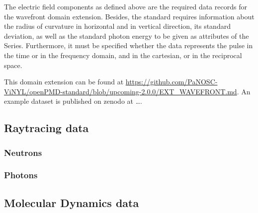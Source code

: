 \documentclass[11pt, a4paper]{article}
\begin{document}
The electric field components as defined above are the required data records for the wavefront domain extension.
Besides, the standard requires information about the radius of curvature in horizontal and in vertical direction, its
standard deviation, as well as the standard photon energy to be given as attributes of the Series. Furthermore, it must
be specified whether the data represents the pulse in the time or in the frequency domain, and in the cartesian, or in
the reciprocal space.

This domain extension can be found at \url{https://github.com/PaNOSC-ViNYL/openPMD-standard/blob/upcoming-2.0.0/EXT_WAVEFRONT.md}.
An example dataset is published on zenodo at \ldots {}.

\subsection{Raytracing data}
\subsubsection{Neutrons}
\subsubsection{Photons}
\subsection{Molecular Dynamics data}
\printbibliography
\end{document}
